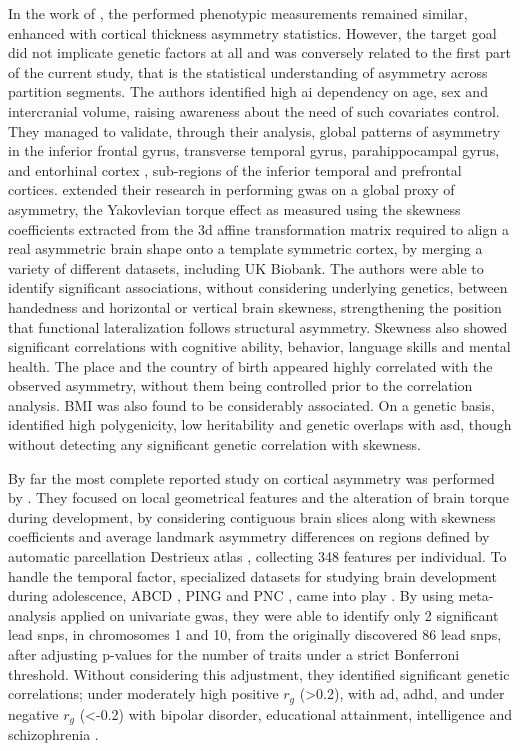 In the work of \citet{Kong2018}, the performed phenotypic measurements remained similar, enhanced with cortical thickness asymmetry statistics. However, the target goal did not implicate genetic factors at all and was conversely related to the first part of the current study, that is the statistical understanding of asymmetry across partition segments. The authors identified high \ac{ai} dependency on age, sex and intercranial volume, raising awareness about the need of such covariates control. They managed to validate, through their analysis, global patterns of asymmetry in the inferior frontal gyrus, transverse temporal gyrus, parahippocampal gyrus, and entorhinal cortex \cite{Kong2018}, sub-regions of the inferior temporal and prefrontal cortices. \citet{Kong2021} extended their research in performing \ac{gwas} on a global proxy of asymmetry, the Yakovlevian torque effect as measured using the skewness coefficients extracted from the \ac{3d} affine transformation matrix required to align a real asymmetric brain shape onto a template symmetric cortex, by merging a variety of different datasets, including UK Biobank. The authors were able to identify significant associations, without considering underlying genetics, between handedness and horizontal or vertical brain skewness, strengthening the position that functional lateralization follows structural asymmetry. Skewness also showed significant correlations with cognitive ability, behavior, language skills and mental health. The place and the country of birth appeared highly correlated with the observed asymmetry, without them being controlled prior to the correlation analysis. BMI was also found to be considerably associated. On a genetic basis, \citet{Kong2021} identified high polygenicity, low heritability and genetic overlaps with \ac{asd}, though without detecting any significant genetic correlation with skewness. 

By far the most complete reported study on cortical asymmetry was performed  by \citet{Zhao2022}. They focused on local geometrical features and the alteration of brain torque during development, by considering contiguous brain slices along with skewness coefficients and average landmark asymmetry differences on regions defined by automatic parcellation Destrieux atlas \cite{Destrieux2010}, collecting 348 features per individual. To handle the temporal factor, specialized datasets for studying brain development during adolescence, ABCD \cite{Volkow2018}, PING \cite{Jernigan2016} and PNC \cite{Satterthwaite2016}, came into play \cite{Zhao2022}. By using meta-analysis applied on univariate \ac{gwas}, they were able to identify only 2 significant lead \acp{snp}, in chromosomes 1 and 10,  from the originally discovered 86 lead \acp{snp}, after adjusting p-values for the number of traits under a strict Bonferroni threshold. Without considering this adjustment, they identified significant genetic correlations; under  moderately high positive $r_g$ (>0.2), with \ac{ad}, \ac{adhd}, and under negative $r_g$ (<-0.2) with bipolar disorder, educational attainment, intelligence and schizophrenia \cite{Zhao2022}. 





